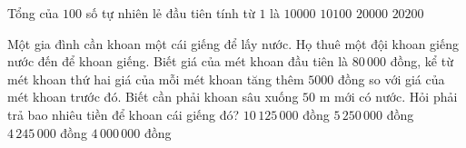\begin{ex}%
	Tổng của $100$ số tự nhiên lẻ đầu tiên tính từ $1$ là
	\choice
	{\True $10000$}
	{$10100$}
	{$20000$}
	{$20200$}
\end{ex}
\begin{ex}%
	Một gia đình cần khoan một cái giếng để lấy nước. Họ thuê một đội khoan giếng nước đến để khoan giếng. Biết giá của mét khoan đầu tiên là $80\,000$ đồng, kể từ mét khoan thứ hai giá của mỗi mét khoan tăng thêm $5000$ đồng so với giá của mét khoan trước đó. Biết cần phải khoan sâu xuống $50$ m mới có nước. Hỏi phải trả bao nhiêu tiền để khoan cái giếng đó?
	\choice 
	{\True $10\, 125\,000$ đồng}
	{$5\, 250\,000$ đồng}
	{$4\, 245\,000$ đồng}
	{$4\, 000\,000$ đồng}
\end{ex}
